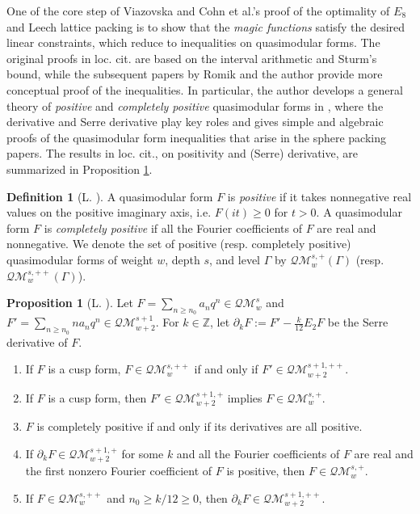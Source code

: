 \documentclass[10pt,reqno]{amsproc}
\newcommand{\QM}{\mathcal{QM}}
\newcommand{\bZ}{\mathbb{Z}}
\newcommand{\1}{\mathds{1}}	%
\theoremstyle{definition}
\newtheorem{proposition}[theorem]{Proposition}
\newtheorem{definition}[theorem]{Definition}
\theoremstyle{remark}
\begin{document}
One of the core step of Viazovska and Cohn et al.'s proof of the optimality of $E_8$ and Leech lattice packing \cite{viazovska2017sphere,cohn2017sphere} is to show that the \emph{magic functions} satisfy the desired linear constraints, which reduce to inequalities on quasimodular forms.
The original proofs in loc. cit. are based on the interval arithmetic and Sturm's bound, while the subsequent papers by Romik \cite{romik2023viazovska} and the author \cite{lee2024algebraic} provide more conceptual proof of the inequalities.
In particular, the author develops a general theory of \emph{positive} and \emph{completely positive} quasimodular forms in \cite{lee2024algebraic}, where the derivative and Serre derivative play key roles and gives simple and algebraic proofs of the quasimodular form inequalities that arise in the sphere packing papers.
The results in loc. cit., on positivity and (Serre) derivative, are summarized in Proposition \ref{prop:derpos}.

\begin{definition}[L. \cite{lee2024algebraic}]
    A quasimodular form $F$ is \emph{positive} if it takes nonnegative real values on the positive imaginary axis, i.e. $F(it) \ge 0$ for $t > 0$.
    A quasimodular form $F$ is \emph{completely positive} if all the Fourier coefficients of $F$ are real and nonnegative.
    We denote the set of positive (resp. completely positive) quasimodular forms of weight $w$, depth $s$, and level $\Gamma$ by $\QM_{w}^{s, +}(\Gamma)$ (resp. $\QM_{w}^{s, ++}(\Gamma)$).
\end{definition}

\begin{proposition}[L. \cite{lee2024algebraic}]
\label{prop:derpos}
Let $F = \sum_{n \geq n_0} a_n q^n \in \QM_{w}^{s}$ and $F' = \sum_{n \geq n_0} na_n q^n \in \QM_{w+2}^{s + 1}$.
For $k \in \bZ$, let $\partial_k F := F' - \frac{k}{12} E_2 F$ be the Serre derivative of $F$.
\begin{enumerate}
    \item If $F$ is a cusp form, $F \in \QM_{w}^{s, ++}$ if and only if $F' \in \QM_{w+2}^{s +1, ++}$. 
    \item If $F$ is a cusp form, then $F' \in \QM_{w +2}^{s +1, +}$ implies $F \in \QM_{w}^{s, +}$.
    \item $F$ is completely positive if and only if its derivatives are all positive. 
    \item If $\partial_{k} F \in \QM_{w+2}^{s+1, +}$ for some $k$ and all the Fourier coefficients of $F$ are real and the first nonzero Fourier coefficient of $F$ is positive, then $F \in \QM_{w}^{s, +}$.
    \item If $F \in \QM_{w}^{s,++}$ and $n_0 \geq k / 12 \geq 0$, then $\partial_k F \in \QM_{w+2}^{s+1, ++}$.
\end{enumerate}
\end{proposition}
\end{document}
